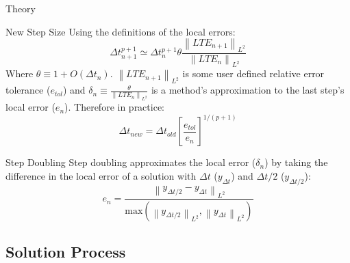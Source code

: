 \documentclass[8pt]{beamer}
\newcommand{\be}{\begin{equation*}}
\newcommand{\ee}{\end{equation*}}
\newcommand{\norm}[1]{\left\lVert#1\right\rVert_{L^2}}
\begin{document}
\begin{frame}{Theory}

\begin{block}{New Step Size}
Using the definitions of the local errors:
\be
\Delta t_{n+1}^{p+1} \simeq \Delta t_{n}^{p+1} \theta \frac{\norm{LTE_{n+1}}}{\norm{LTE_{n}}}
\ee
Where $\theta \equiv 1 + O(\Delta t_n)$. $\norm{LTE_{n+1}}$ is some user defined relative error tolerance ($e_{tol}$) and $\delta_n \equiv \frac{\theta}{\norm{LTE_{n}}}$ is a method's approximation to the last step's local error ($e_n$).  Therefore in practice:
\be
\Delta t_{new} = \Delta t_{old} \left[\frac{e_{tol}}{e_n}\right]^{1/(p+1)}
\ee
\end{block}

\begin{block}{Step Doubling}
Step doubling approximates the local error ($\delta_n$) by taking the difference in the local error of a solution with $\Delta t$ ($y_{\Delta t}$) and $\Delta t/2$ ($y_{\Delta t/2}$):
\be
e_n = \frac{\norm{y_{\Delta t/2} - y_{\Delta t}}}{\text{max}\left(\norm{y_{\Delta t/2}},\norm{y_{\Delta t}}\right)}
\ee
\end{block}

\end{frame}

\subsection{Solution Process}
\end{document}
